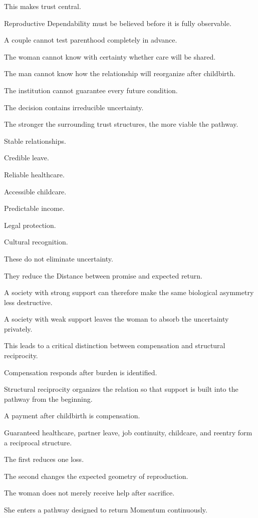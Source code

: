 This makes trust central.

Reproductive Dependability must be believed before it is fully observable.

A couple cannot test parenthood completely in advance.

The woman cannot know with certainty whether care will be shared.

The man cannot know how the relationship will reorganize after childbirth.

The institution cannot guarantee every future condition.

The decision contains irreducible uncertainty.

The stronger the surrounding trust structures, the more viable the pathway.

Stable relationships.

Credible leave.

Reliable healthcare.

Accessible childcare.

Predictable income.

Legal protection.

Cultural recognition.

These do not eliminate uncertainty.

They reduce the Distance between promise and expected return.

A society with strong support can therefore make the same biological asymmetry less destructive.

A society with weak support leaves the woman to absorb the uncertainty privately.

This leads to a critical distinction between compensation and structural reciprocity.

Compensation responds after burden is identified.

Structural reciprocity organizes the relation so that support is built into the pathway from the beginning.

A payment after childbirth is compensation.

Guaranteed healthcare, partner leave, job continuity, childcare, and reentry form a reciprocal structure.

The first reduces one loss.

The second changes the expected geometry of reproduction.

The woman does not merely receive help after sacrifice.

She enters a pathway designed to return Momentum continuously.

